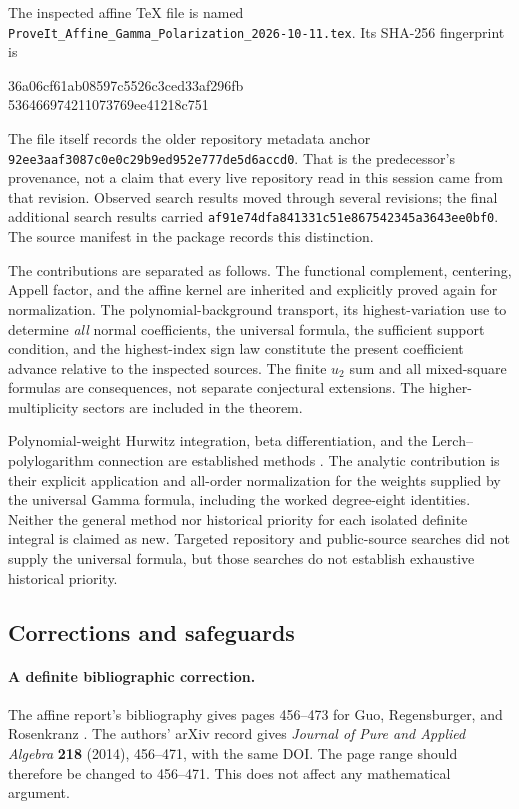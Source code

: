 \documentclass[11pt,letterpaper]{article}
\numberwithin{equation}{section}
\theoremstyle{definition}\newtheorem{definition}[theorem]{Definition}
\theoremstyle{remark}\newtheorem{remark}[theorem]{Remark}
\newcommand{\src}[1]{\nolinkurl{#1}}
\begin{document}
The inspected affine TeX file is named
\src{ProveIt_Affine_Gamma_Polarization_2026-10-11.tex}.
Its SHA-256 fingerprint is
\begin{center}\small\ttfamily
36a06cf61ab08597c5526c3ced33af296fb\\
536466974211073769ee41218c751
\end{center}
The file itself records the older repository metadata anchor
\src{92ee3aaf3087c0e0c29b9ed952e777de5d6accd0}.
That is the predecessor's provenance, not a claim that every live
repository read in this session came from that revision.
Observed search results moved through several revisions; the final
additional search results carried
\src{af91e74dfa841331c51e867542345a3643ee0bf0}.
The source manifest in the package records this distinction.

The contributions are separated as follows. The functional complement,
centering, Appell factor, and the affine kernel are inherited and
explicitly proved again for normalization. The polynomial-background
transport, its highest-variation use to determine \emph{all} normal
coefficients, the universal formula, the sufficient support condition,
and the highest-index sign law constitute the present coefficient
advance relative to the inspected sources. The finite $u_2$ sum and
all mixed-square formulas are consequences, not separate conjectural
extensions. The higher-multiplicity sectors are included in the theorem.

Polynomial-weight Hurwitz integration, beta differentiation, and the
Lerch--polylogarithm connection are established methods
\cite{EM1,EM2,DLMFzeta,DLMFlerch,DLMFpolylog}.
The analytic contribution is their explicit application and all-order
normalization for the weights supplied by the universal Gamma formula,
including the worked degree-eight identities. Neither the general
method nor historical priority for each isolated definite integral is
claimed as new. Targeted repository and public-source searches did not
supply the universal formula, but those searches do not establish
exhaustive historical priority.

\subsection{Corrections and safeguards}
\paragraph{A definite bibliographic correction.}
The affine report's bibliography gives pages 456--473 for Guo,
Regensburger, and Rosenkranz \cite{GRR}. The authors' arXiv record gives
\emph{Journal of Pure and Applied Algebra} \textbf{218} (2014),
456--471, with the same DOI. The page range should therefore be changed
to 456--471. This does not affect any mathematical argument.
\end{document}
